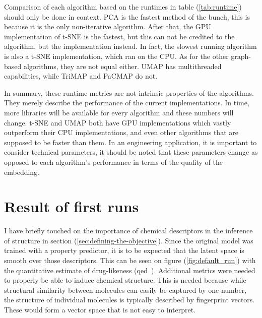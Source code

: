 Comparison of each algorithm based on the runtimes in table (\ref{tab:runtime}) should only be done in context. PCA is the fastest method of the bunch, this is because it is the only non-iterative algorithm. After that, the GPU implementation of t-SNE is the fastest, but this can not be credited to the algorithm, but the implementation instead. In fact, the slowest running algorithm is also a t-SNE implementation, which ran on the CPU. As for the other graph-based algorithms, they are not equal either. UMAP has multithreaded capabilities, while TriMAP and PaCMAP do not.

In summary, these runtime metrics are not intrinsic properties of the algorithms. They merely describe the performance of the current implementations. In time, more libraries will be available for every algorithm and these numbers will change. t-SNE and UMAP both have GPU implementations which vastly outperform their CPU implementations, and even other algorithms that are supposed to be faster than them. In an engineering application, it is important to consider technical parameters, it should be noted that these parameters change as opposed to each algorithm's performance in terms of the quality of the embedding.

\section{Result of first runs}\label{sec:result-of-first-runs}

I have briefly touched on the importance of chemical descriptors in the inference of structure in section (\ref{sec:defining-the-objective}). Since the original model was trained with a property predictor, it is to be expected that the latent space is smooth over those descriptors. This can be seen on figure (\ref{fig:default_run}) with the quantitative estimate of drug-likeness (qed~\cite{bib:qed}). Additional metrics were needed to properly be able to induce chemical structure. This is needed because while structural similarity between molecules can easily be captured by one number, the structure of individual molecules is typically described by fingerprint vectors. These would form a vector space that is not easy to interpret.

